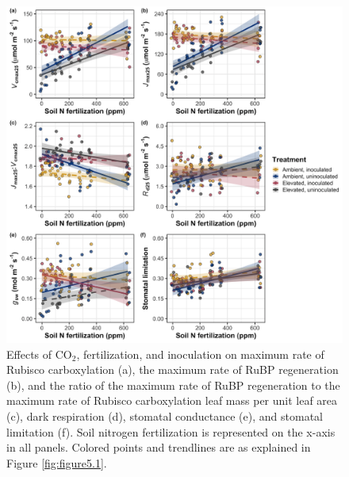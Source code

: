 \newpage
\begin{figure}
    \centering
    \includegraphics[width=\columnwidth]{ch5_NxCO2xI/figs/NxCO2xI_fig2_photo.jpg}
    \caption[Effects of CO$_2$, fertilization, and inoculation on maximum rate of Rubisco carboxylation, the maximum rate of RuBP regeneration, and the ratio of the maximum rate of RuBP regeneration to the maximum rate of Rubisco carboxylation leaf mass per unit leaf area, dark respiration, stomatal conductance, and stomatal limitation]{Effects of CO$_2$, fertilization, and inoculation on maximum rate of Rubisco carboxylation (a), the maximum rate of RuBP regeneration (b), and the ratio of the maximum rate of RuBP regeneration to the maximum rate of Rubisco carboxylation leaf mass per unit leaf area (c), dark respiration (d), stomatal conductance (e), and stomatal limitation (f). Soil nitrogen fertilization is represented on the x-axis in all panels. Colored points and trendlines are as explained in Figure \ref{fig:figure5.1}.}
    \label{fig:figure5.2}
\end{figure}
\clearpage

